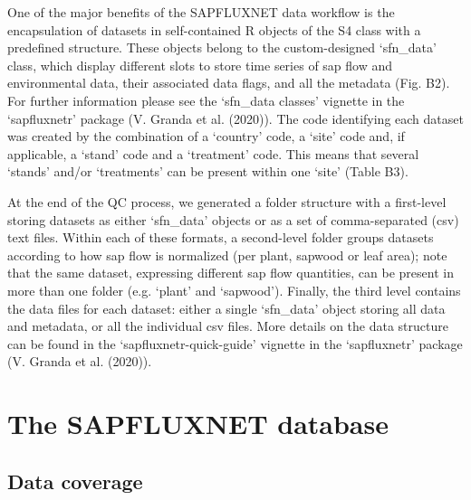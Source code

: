 \documentclass[11pt,twoside]{reedthesis}
\begin{document}
One of the major benefits of the SAPFLUXNET data workflow is the
encapsulation of datasets in self-contained R objects of the S4 class
with a predefined structure. These objects belong to the custom-designed
`sfn\_data' class, which display different slots to store time series of
sap flow and environmental data, their associated data flags, and all
the metadata (Fig. B2). For further information please see the
`sfn\_data classes' vignette in the `sapfluxnetr' package (V. Granda et
al. (2020)). The code identifying each dataset was created by the
combination of a `country' code, a `site' code and, if applicable, a
`stand' code and a `treatment' code. This means that several `stands'
and/or `treatments' can be present within one `site' (Table B3).\par

At the end of the QC process, we generated a folder structure with a
first-level storing datasets as either `sfn\_data' objects or as a set
of comma-separated (csv) text files. Within each of these formats, a
second-level folder groups datasets according to how sap flow is
normalized (per plant, sapwood or leaf area); note that the same
dataset, expressing different sap flow quantities, can be present in
more than one folder (e.g. `plant' and `sapwood'). Finally, the third
level contains the data files for each dataset: either a single
`sfn\_data' object storing all data and metadata, or all the individual
csv files. More details on the data structure can be found in the
`sapfluxnetr-quick-guide' vignette in the `sapfluxnetr' package (V.
Granda et al. (2020)).\par

\section{The SAPFLUXNET database}\label{the-sapfluxnet-database}

\subsection{Data coverage}\label{data-coverage}
\end{document}
